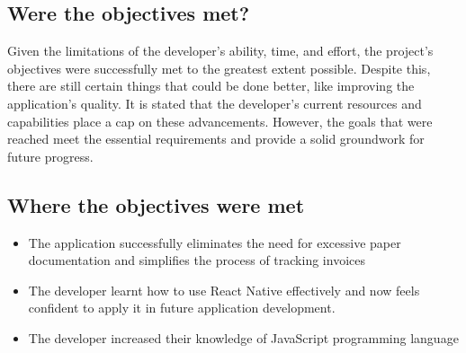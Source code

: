 \subsection{Were the objectives met?}
Given the limitations of the developer's ability, time, and effort, the project's objectives were successfully met to the greatest extent possible. Despite this, there are still certain things that could be done better, like improving the application's quality. It is stated that the developer's current resources and capabilities place a cap on these advancements. However, the goals that were reached meet the essential requirements and provide a solid groundwork for future progress.

\subsection{Where the objectives were met}

\begin{itemize}
    \item The application successfully eliminates the need for excessive paper documentation and simplifies the process of tracking invoices
    \item The developer learnt how to use React Native effectively and now feels confident to apply it in future application development.
    \item The developer increased their knowledge of JavaScript programming language
\end{itemize}


